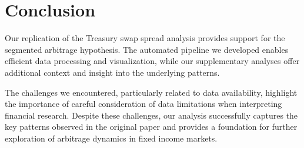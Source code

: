 \documentclass[12pt]{article}
\begin{document}
\section{Conclusion}

Our replication of the Treasury swap spread analysis provides support for the segmented arbitrage hypothesis. The automated pipeline we developed enables efficient data processing and visualization, while our supplementary analyses offer additional context and insight into the underlying patterns.

The challenges we encountered, particularly related to data availability, highlight the importance of careful consideration of data limitations when interpreting financial research. Despite these challenges, our analysis successfully captures the key patterns observed in the original paper and provides a foundation for further exploration of arbitrage dynamics in fixed income markets.



\end{document}
